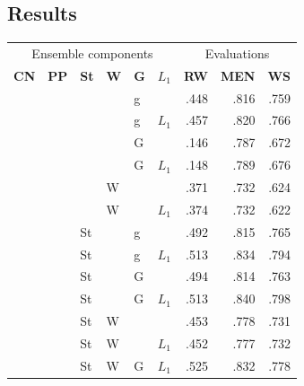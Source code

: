 \documentclass[11pt,letterpaper]{article}
\begin{document}
\subsection{Results}

\begin{table}[t]
\centering
\footnotesize
\begin{tabular}{llllll|rrr}
\toprule
\multicolumn{6}{c|}{Ensemble components} & \multicolumn{3}{c}{Evaluations} \\
\bf CN&\bf PP&\bf St&\bf W& \bf G& $L_1$  & \bf RW  & \bf MEN & \bf  WS \\
\midrule
     &      &      &      & g    &        &    .448 &    .816 &    .759 \\  %
     &      &      &      & g    & $L_1$  &    .457 &    .820 &    .766 \\  %
     &      &      &      & G    &        &    .146 &    .787 &    .672 \\  %
     &      &      &      & G    & $L_1$  &    .148 &    .789 &    .676 \\  %
     &      &      & W    &      &        &    .371 &    .732 &    .624 \\  %
     &      &      & W    &      & $L_1$  &    .374 &    .732 &    .622 \\  %
\midrule
     &      & St   &      & g    &        &    .492 &    .815 &    .765 \\  %
     &      & St   &      & g    & $L_1$  &    .513 &    .834 &    .794 \\  %
     &      & St   &      & G    &        &    .494 &    .814 &    .763 \\  %
     &      & St   &      & G    & $L_1$  &    .513 &    .840 &    .798 \\  %
     &      & St   & W    &      &        &    .453 &    .778 &    .731 \\  %
     &      & St   & W    &      & $L_1$  &    .452 &    .777 &    .732 \\  %
     &      & St   & W    & G    & $L_1$  &    .525 &    .832 &    .778 \\  %

\end{tabular}
\end{table}
\end{document}
